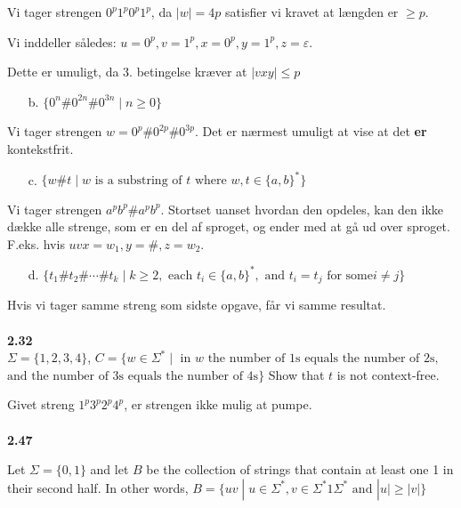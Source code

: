 Vi tager strengen $0^{p}1^{p}0^{p}1^{p}$, da $|w| = 4p$ satisfier vi kravet at længden er $\ge p$.

Vi inddeller således: $u= 0^{p}, v = 1^{p}, x = 0^{p}, y = 1^{p}, z = \varepsilon$.

Dette er umuligt, da 3. betingelse kræver at $|vxy| \leq p$

\begin{enumerate}
  \item[b.] $\{0^{n}\# 0^{2n} \# 0^{3n} \; | \; n \ge 0\}$
\end{enumerate}

Vi tager strengen $w = 0^{p}\#0^{2p}\#0^{3p}$. Det er nærmest umuligt at vise at det \textbf{er} kontekstfrit.

\begin{enumerate}
  \item[c.] $\{w\#t \; | \; w \text{ is a substring of }t \text{ where }w,t \in \{a,b\}^{*}\}$
\end{enumerate}

Vi tager strengen $a^{p}b^{p}\#a^{p}b^{p}$. Stortset uanset hvordan den opdeles, kan den ikke dække alle strenge, som er en del af sproget, og ender med at gå ud over sproget. F.eks. hvis $uvx = w_{1}, y = \#, z = w_{2}$.

\begin{enumerate}
  \item[d.] $\{t_{1}\#t_{2}\# \cdots \# t_{k}\;|\; k \ge 2, \text{ each } t_{i} \in \{a,b\}^{*}, \text{ and } t_{i}=t_{j} \text{ for some} i \ne j\}$
\end{enumerate}
Hvis vi tager samme streng som sidste opgave, får vi samme resultat.\\\\
\noindent
{\Large \textbf{2.32}}\\
\noindent
$\Sigma = \{1,2,3,4\}$, $C = \{w \in \Sigma^{*} \; | \; \text{ in }w \text{ the number of 1s equals the number of 2s,}$\\
\noindent
$\text{and the number of 3s equals the number of 4s}\}$ Show that $t$ is not context-free.

Givet streng $1^{p}3^{p}2^{p}4^{p}$, er strengen ikke mulig at pumpe.\\\\

\noindent
{\Large \textbf{2.47}}\\
\noindent

Let $\Sigma = \{0,1\}$ and let $B$ be the collection of strings that contain at least one 1 in their second half. In other words, $B = \{uv \; |\; u \in \Sigma^{*}, v \in \Sigma^{*}1\Sigma^{*} \text{ and } |u| \ge |v|\}$

